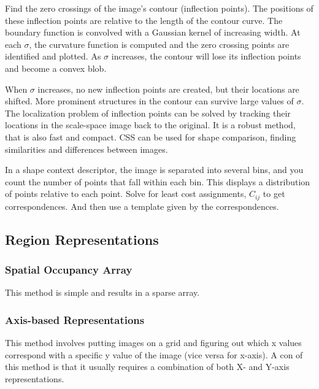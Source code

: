 \documentclass{article}
\begin{document}
\begin{multicols}{2}
  Find the zero crossings of the image's contour (inflection points).
  The positions of these inflection points are relative to the length of the contour curve.
  The boundary function is convolved with a Gaussian kernel of increasing width.
  At each $\sigma$, the curvature function is computed and the zero crossing points are identified and plotted.
  As $\sigma$ increases, the contour will lose its inflection points and become a convex blob.
  
  \vspace{5mm}
  
  When $\sigma$ increases, no new inflection points are created, but their locations are shifted.
  More prominent structures in the contour can survive large values of $\sigma$.
  The localization problem of inflection points can be solved by tracking their locations in the scale-space image back to the original.
  It is a robust method, that is also fast and compact.
  CSS can be used for shape comparison, finding similarities and differences between images.

  \vspace{5mm}

  In a shape context descriptor, the image is separated into several bins, and you count the number of points that fall within each bin. This displays a distribution of points relative to each point.
  Solve for least cost assignments, $C_{ij}$ to get correspondences. And then use a template given by the correspondences.

 \subsection{Region Representations}
 \subsubsection{Spatial Occupancy Array}

  This method is simple and results in a sparse array.

 \subsubsection{Axis-based Representations}

  This method involves putting images on a grid and figuring out which x values correspond with a specific y value of the image (vice versa for x-axis).
  A con of this method is that it usually requires a combination of both X- and Y-axis representations.


\end{multicols}
\end{document}

